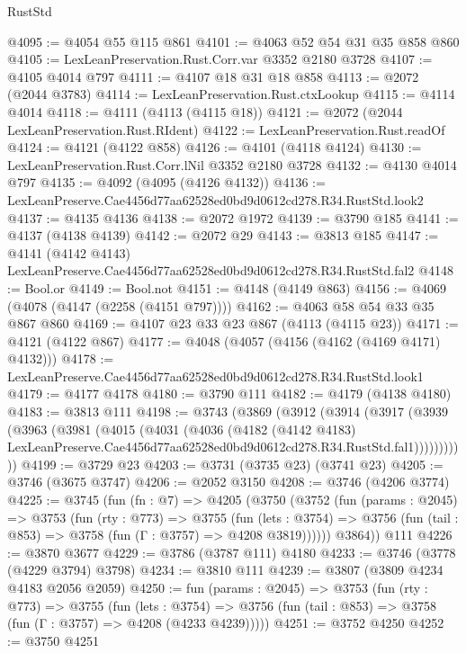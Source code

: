 \begin{lexlean}{RustStd}
\begin{coremodule}
@4095 := @4054 @55 @115 @861
@4101 := @4063 @52 @54 @31 @35 @858 @860
@4105 := LexLeanPreservation.Rust.Corr.var @3352 @2180 @3728
@4107 := @4105 @4014 @797
@4111 := @4107 @18 @31 @18 @858
@4113 := @2072 (@2044 @3783)
@4114 := LexLeanPreservation.Rust.ctxLookup
@4115 := @4114 @4014
@4118 := @4111 (@4113 (@4115 @18))
@4121 := @2072 (@2044 LexLeanPreservation.Rust.RIdent)
@4122 := LexLeanPreservation.Rust.readOf
@4124 := @4121 (@4122 @858)
@4126 := @4101 (@4118 @4124)
@4130 := LexLeanPreservation.Rust.Corr.lNil @3352 @2180 @3728
@4132 := @4130 @4014 @797
@4135 := @4092 (@4095 (@4126 @4132))
@4136 := LexLeanPreserve.Cae4456d77aa62528ed0bd9d0612cd278.R34.RustStd.look2
@4137 := @4135 @4136
@4138 := @2072 @1972
@4139 := @3790 @185
@4141 := @4137 (@4138 @4139)
@4142 := @2072 @29
@4143 := @3813 @185
@4147 := @4141 (@4142 @4143) LexLeanPreserve.Cae4456d77aa62528ed0bd9d0612cd278.R34.RustStd.fal2
@4148 := Bool.or
@4149 := Bool.not
@4151 := @4148 (@4149 @863)
@4156 := @4069 (@4078 (@4147 (@2258 (@4151 @797))))
@4162 := @4063 @58 @54 @33 @35 @867 @860
@4169 := @4107 @23 @33 @23 @867 (@4113 (@4115 @23))
@4171 := @4121 (@4122 @867)
@4177 := @4048 (@4057 (@4156 (@4162 (@4169 @4171) @4132)))
@4178 := LexLeanPreserve.Cae4456d77aa62528ed0bd9d0612cd278.R34.RustStd.look1
@4179 := @4177 @4178
@4180 := @3790 @111
@4182 := @4179 (@4138 @4180)
@4183 := @3813 @111
@4198 := @3743
    (@3869
      (@3912
        (@3914
          (@3917
            (@3939
              (@3963
                (@3981
                  (@4015
                    (@4031
                      (@4036
                        (@4182
                          (@4142 @4183)
                          LexLeanPreserve.Cae4456d77aa62528ed0bd9d0612cd278.R34.RustStd.fal1)))))))))))
@4199 := @3729 @23
@4203 := @3731 (@3735 @23) (@3741 @23)
@4205 := @3746 (@3675 @3747)
@4206 := @2052 @3150
@4208 := @3746 (@4206 @3774)
@4225 := @3745
    (fun (fn : @7) =>
    @4205
      (@3750
        (@3752
          (fun (params : @2045) =>
          @3753
            (fun (rty : @773) =>
            @3755
              (fun (lets : @3754) =>
              @3756 (fun (tail : @853) => @3758 (fun (Γ : @3757) => @4208 @3819))))))
        @3864))
    @111
@4226 := @3870 @3677
@4229 := @3786 (@3787 @111) @4180
@4233 := @3746 (@3778 (@4229 @3794) @3798)
@4234 := @3810 @111
@4239 := @3807 (@3809 @4234 @4183 @2056 @2059)
@4250 := fun (params : @2045) =>
  @3753
    (fun (rty : @773) =>
    @3755
      (fun (lets : @3754) =>
      @3756 (fun (tail : @853) => @3758 (fun (Γ : @3757) => @4208 (@4233 @4239)))))
@4251 := @3752 @4250
@4252 := @3750 @4251

\end{coremodule}
\end{lexlean}
